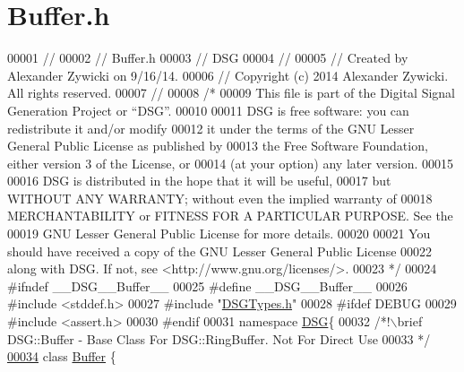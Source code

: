 \hypertarget{_buffer_8h_source}{\section{Buffer.\+h}
\label{_buffer_8h_source}
}

\begin{DoxyCode}
00001 \textcolor{comment}{//}
00002 \textcolor{comment}{//  Buffer.h}
00003 \textcolor{comment}{//  DSG}
00004 \textcolor{comment}{//}
00005 \textcolor{comment}{//  Created by Alexander Zywicki on 9/16/14.}
00006 \textcolor{comment}{//  Copyright (c) 2014 Alexander Zywicki. All rights reserved.}
00007 \textcolor{comment}{//}
00008 \textcolor{comment}{/*}
00009 \textcolor{comment}{ This file is part of the Digital Signal Generation Project or “DSG”.}
00010 \textcolor{comment}{}
00011 \textcolor{comment}{ DSG is free software: you can redistribute it and/or modify}
00012 \textcolor{comment}{ it under the terms of the GNU Lesser General Public License as published by}
00013 \textcolor{comment}{ the Free Software Foundation, either version 3 of the License, or}
00014 \textcolor{comment}{ (at your option) any later version.}
00015 \textcolor{comment}{}
00016 \textcolor{comment}{ DSG is distributed in the hope that it will be useful,}
00017 \textcolor{comment}{ but WITHOUT ANY WARRANTY; without even the implied warranty of}
00018 \textcolor{comment}{ MERCHANTABILITY or FITNESS FOR A PARTICULAR PURPOSE.  See the}
00019 \textcolor{comment}{ GNU Lesser General Public License for more details.}
00020 \textcolor{comment}{}
00021 \textcolor{comment}{ You should have received a copy of the GNU Lesser General Public License}
00022 \textcolor{comment}{ along with DSG.  If not, see <http://www.gnu.org/licenses/>.}
00023 \textcolor{comment}{ */}
00024 \textcolor{preprocessor}{#ifndef \_\_DSG\_\_Buffer\_\_}
00025 \textcolor{preprocessor}{#define \_\_DSG\_\_Buffer\_\_}
00026 \textcolor{preprocessor}{#include <stddef.h>}
00027 \textcolor{preprocessor}{#include "\hyperlink{_d_s_g_types_8h}{DSGTypes.h}"}
00028 \textcolor{preprocessor}{#ifdef DEBUG}
00029 \textcolor{preprocessor}{#include <assert.h>}
00030 \textcolor{preprocessor}{#endif}
00031 \textcolor{keyword}{namespace }\hyperlink{namespace_d_s_g}{DSG}\{\textcolor{comment}{}
00032 \textcolor{comment}{    /*!\(\backslash\)brief DSG::Buffer - Base Class For DSG::RingBuffer. Not For Direct Use}
00033 \textcolor{comment}{     */}
\hypertarget{_buffer_8h_source_l00034}{}\hyperlink{class_d_s_g_1_1_buffer}{00034}     \textcolor{keyword}{class }\hyperlink{class_d_s_g_1_1_buffer}{Buffer} \{

\end{DoxyCode}
